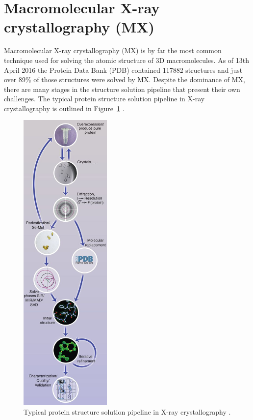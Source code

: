 \section{Macromolecular X-ray crystallography (MX)}
\label{sec:X-ray crystallography}

    Macromolecular X-ray crystallography (MX) is by far the most common technique used for solving the atomic structure of 3D macromolecules.
    As of 13th April 2016 the Protein Data Bank (PDB) contained 117882 structures and just over 89\% of those structures were solved by MX.
    Despite the dominance of MX, there are many stages in the structure solution pipeline that present their own challenges.
    The typical protein structure solution pipeline in X-ray crystallography is outlined in Figure~\ref{fig:Crystallography-pipeline} \cite{garman2014}.

    \begin{figure}
        \centering
        \includegraphics[width=0.4\textwidth]{figures/introduction/crystallography_pipeline.jpg}
        \caption{Typical protein structure solution pipeline in X-ray crystallography \cite{garman2014}.}
        \label{fig:Crystallography-pipeline}
    \end{figure}

